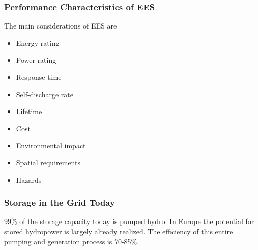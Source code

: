 \subsubsection{Performance Characteristics of EES}
The main considerations of EES are
\begin{itemize}
    \item Energy rating
    \item Power rating
    \item Response time
    \item Self-discharge rate
    \item Lifetime
    \item Cost
    \item Environmental impact
    \item Spatial requirements
    \item Hazards
\end{itemize}

\subsubsection{Storage in the Grid Today}
99\% of the storage capacity today is pumped hydro.
In Europe the potential for stored hydropower is largely already realized.
The efficiency of this entire pumping and generation process is 70-85\%.






